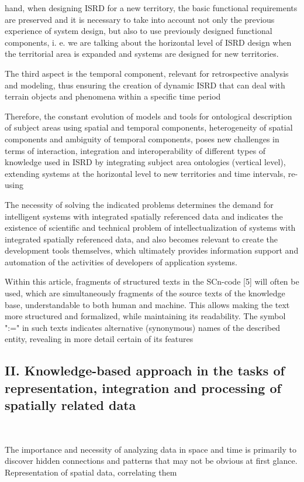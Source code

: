 \documentclass [10pt, letterpaper]{article}
\begin{document}
\begin{multicols}{2}
{hand, when designing ISRD for a new territory, the basic
functional requirements are preserved and it is necessary
to take into account not only the previous experience
of system design, but also to use previously designed
functional components, i. e. we are talking about the
horizontal level of ISRD design when the territorial area
is expanded and systems are designed for new territories.
}\par{The third aspect is the temporal component, relevant
for retrospective analysis and modeling, thus ensuring
the creation of dynamic ISRD that can deal with terrain
objects and phenomena within a specific time period}
\par{Therefore, the constant evolution of models and tools
for ontological description of subject areas using spatial
and temporal components, heterogeneity of spatial components and ambiguity of temporal components, poses
new challenges in terms of interaction, integration and
interoperability of different types of knowledge used in
ISRD by integrating subject area ontologies (vertical
level), extending systems at the horizontal level to new
territories and time intervals, re-using}\par{The necessity of solving the indicated problems determines the demand for intelligent systems with integrated
spatially referenced data and indicates the existence of
scientific and technical problem of intellectualization of
systems with integrated spatially referenced data, and
also becomes relevant to create the development tools
themselves, which ultimately provides information support and automation of the activities of developers of
application systems.
}\par{Within this article, fragments of structured texts in
the SCn-code [5] will often be used, which are simultaneously fragments of the source texts of the knowledge
base, understandable to both human and machine. This
allows making the text more structured and formalized,
while maintaining its readability. The symbol ":=" in
such texts indicates alternative (synonymous) names of
the described entity, revealing in more detail certain of
its features}
\\\quad
\begin{center}
     \section*{\normalsize{II. Knowledge-based approach in the tasks of
representation, integration and processing of spatially
related data}}
\end{center}
\\\quad
\par The importance and necessity of analyzing data in
space and time is primarily to discover hidden connections and patterns that may not be obvious at first
glance. Representation of spatial data, correlating them


\end{multicols}
\end{document}
